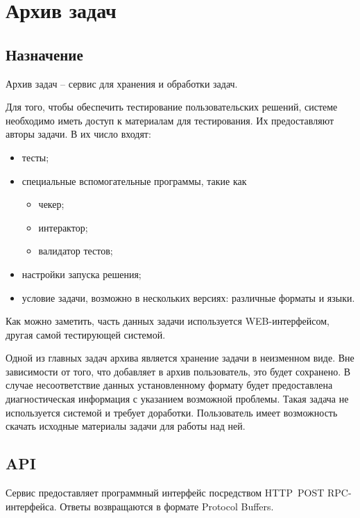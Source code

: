 \section{Архив задач}
\subsection{Назначение}
Архив задач -- сервис для хранения и обработки задач.

Для того, чтобы обеспечить тестирование пользовательских решений,
системе необходимо иметь доступ к материалам для тестирования.
Их предоставляют авторы задачи. В их число входят:
\begin{itemize}
    \item тесты;
    \item специальные вспомогательные программы, такие как
        \begin{itemize}
            \item чекер;
            \item интерактор;
            \item валидатор тестов;
        \end{itemize}
    \item настройки запуска решения;
    \item условие задачи, возможно в нескольких версиях: различные форматы и языки.
\end{itemize}

Как можно заметить, часть данных задачи используется WEB-интерфейсом,
другая самой тестирующей системой.

Одной из главных задач архива является хранение задачи
в неизменном виде. Вне зависимости от того, что добавляет
в архив пользователь, это будет сохранено. В случае несоответствие
данных установленному формату будет предоставлена диагностическая информация
с указанием возможной проблемы. Такая задача не используется системой и требует
доработки. Пользователь имеет возможность скачать исходные материалы задачи
для работы над ней.

\subsection{API}
Сервис предоставляет программный интерфейс посредством
HTTP~POST RPC-интерфейса. Ответы возвращаются в формате Protocol Buffers.

